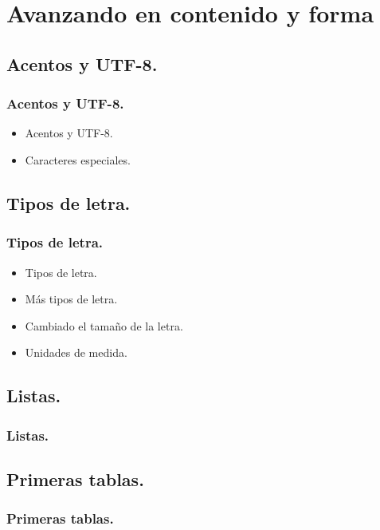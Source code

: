 \documentclass{beamer}
\begin{document}
\section{Avanzando en contenido y forma}
\subsection{Acentos y UTF-8.}
\begin{frame}
  \frametitle{Acentos y UTF-8.}
  \begin{itemize}
   \item<1->{Acentos y UTF-8.}
   \item<2->{Caracteres especiales.}
  \end{itemize}
\end{frame}

\subsection{Tipos de letra.}
\begin{frame}
  \frametitle{Tipos de letra.}
  \begin{itemize}
  \item<1->{Tipos de letra.}
  \item<2->{Más tipos de letra.}
  \item<3->{Cambiado el tamaño de la letra.}
  \item<4->{Unidades de medida.}
  \end{itemize}
\end{frame}

\subsection{Listas.}
\begin{frame}
  \frametitle{Listas.}
\end{frame}

\subsection{Primeras tablas.}
\begin{frame}
  \frametitle{Primeras tablas.}
\end{frame}
\end{document}
